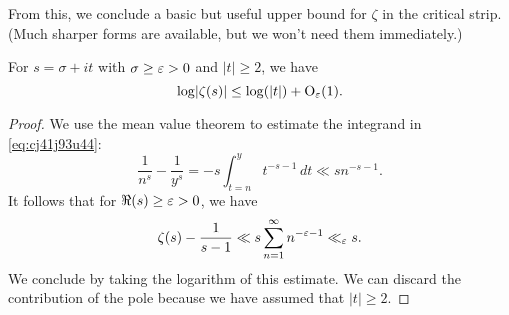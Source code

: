 \documentclass[reqno]{amsart}  \numberwithin{theorem}{section} \numberwithin{equation}{section}
\begin{document}
From this, we conclude a basic but useful upper bound for $\zeta$ in the critical strip.  (Much sharper forms are available, but we won't need them immediately.)
\begin{lemma}\label{lemma:cj56e5ibho}
  For $s = \sigma + it $ with $\sigma \geq \varepsilon > 0$ and $\lvert t \rvert \geq 2$, we have
  \begin{equation}\label{eq:cj41kdcbj7}
    \log \lvert \zeta(s) \rvert \leq \log (\lvert t \rvert) + \operatorname{O}_{\varepsilon}(1).
  \end{equation}
\end{lemma}
\begin{proof}
  We use the mean value theorem to estimate the integrand in \eqref{eq:cj41j93u44}:
  \begin{equation*}
    \frac{1}{n^s }  - \frac{1}{y^s}
    = - s \int_{t = n}^y t^{-s - 1} \, d t
    \ll s n^{-s - 1}.
  \end{equation*}
  It follows that for $\Re(s) \geq \varepsilon > 0$, we have
  \begin{equation*}
    \zeta(s) - \frac{1}{s - 1}
    \ll s \sum_{n = 1}^\infty n^{-\varepsilon - 1}
    \ll_\varepsilon s.
  \end{equation*}
  We conclude by taking the logarithm of this estimate.  We can discard the contribution of the pole because we have assumed that $\lvert t \rvert \geq 2$.
\end{proof}
\end{document}
